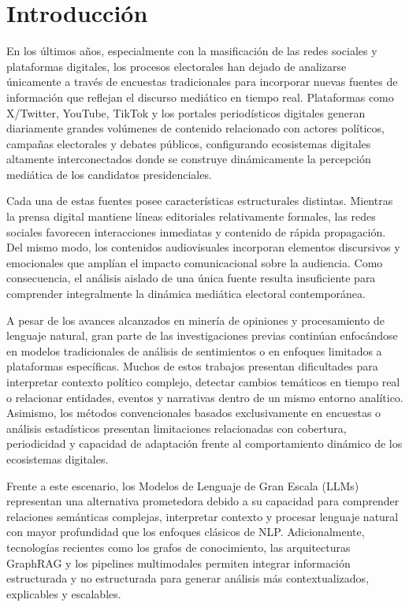 
\chapter*{Introducción}
{}

En los últimos años, especialmente con la masificación de las redes sociales y plataformas digitales, los procesos electorales han dejado de analizarse únicamente a través de encuestas tradicionales para incorporar nuevas fuentes de información que reflejan el discurso mediático en tiempo real. Plataformas como X/Twitter, YouTube, TikTok y los portales periodísticos digitales generan diariamente grandes volúmenes de contenido relacionado con actores políticos, campañas electorales y debates públicos, configurando ecosistemas digitales altamente interconectados donde se construye dinámicamente la percepción mediática de los candidatos presidenciales.

Cada una de estas fuentes posee características estructurales distintas. Mientras la prensa digital mantiene líneas editoriales relativamente formales, las redes sociales favorecen interacciones inmediatas y contenido de rápida propagación. Del mismo modo, los contenidos audiovisuales incorporan elementos discursivos y emocionales que amplían el impacto comunicacional sobre la audiencia. Como consecuencia, el análisis aislado de una única fuente resulta insuficiente para comprender integralmente la dinámica mediática electoral contemporánea.

A pesar de los avances alcanzados en minería de opiniones y procesamiento de lenguaje natural, gran parte de las investigaciones previas continúan enfocándose en modelos tradicionales de análisis de sentimientos o en enfoques limitados a plataformas específicas. Muchos de estos trabajos presentan dificultades para interpretar contexto político complejo, detectar cambios temáticos en tiempo real o relacionar entidades, eventos y narrativas dentro de un mismo entorno analítico. Asimismo, los métodos convencionales basados exclusivamente en encuestas o análisis estadísticos presentan limitaciones relacionadas con cobertura, periodicidad y capacidad de adaptación frente al comportamiento dinámico de los ecosistemas digitales.

Frente a este escenario, los Modelos de Lenguaje de Gran Escala (LLMs) representan una alternativa prometedora debido a su capacidad para comprender relaciones semánticas complejas, interpretar contexto y procesar lenguaje natural con mayor profundidad que los enfoques clásicos de NLP. Adicionalmente, tecnologías recientes como los grafos de conocimiento, las arquitecturas GraphRAG y los pipelines multimodales permiten integrar información estructurada y no estructurada para generar análisis más contextualizados, explicables y escalables.

